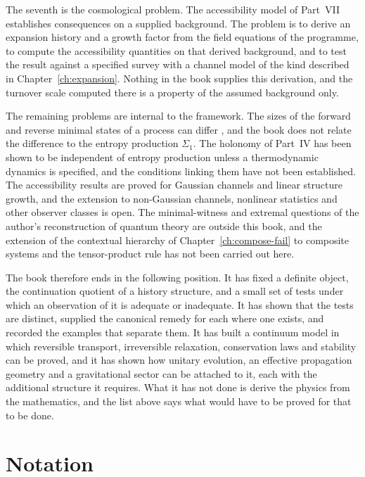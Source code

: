 \documentclass[11pt,oneside]{book}
\theoremstyle{definition}
\theoremstyle{remark}
\begin{document}
The seventh is the cosmological problem. The accessibility model of Part~VII establishes consequences on a supplied background. The problem is to derive an expansion history and a growth factor from the field equations of the programme, to compute the accessibility quantities on that derived background, and to test the result against a specified survey with a channel model of the kind described in Chapter~\ref{ch:expansion}. Nothing in the book supplies this derivation, and the turnover scale computed there is a property of the assumed background only.

The remaining problems are internal to the framework. The sizes of the forward and reverse minimal states of a process can differ \cite{ellison2009}, and the book does not relate the difference to the entropy production $\Sigma_1$. The holonomy of Part~IV has been shown to be independent of entropy production unless a thermodynamic dynamics is specified, and the conditions linking them have not been established. The accessibility results are proved for Gaussian channels and linear structure growth, and the extension to non-Gaussian channels, nonlinear statistics and other observer classes is open. The minimal-witness and extremal questions of the author's reconstruction of quantum theory \cite{flyxion2026uqm} are outside this book, and the extension of the contextual hierarchy of Chapter~\ref{ch:compose-fail} to composite systems and the tensor-product rule has not been carried out here.

The book therefore ends in the following position. It has fixed a definite object, the continuation quotient of a history structure, and a small set of tests under which an observation of it is adequate or inadequate. It has shown that the tests are distinct, supplied the canonical remedy for each where one exists, and recorded the examples that separate them. It has built a continuum model in which reversible transport, irreversible relaxation, conservation laws and stability can be proved, and it has shown how unitary evolution, an effective propagation geometry and a gravitational sector can be attached to it, each with the additional structure it requires. What it has not done is derive the physics from the mathematics, and the list above says what would have to be proved for that to be done.

\appendix

\chapter{Notation}\label{app:notation}
\end{document}
